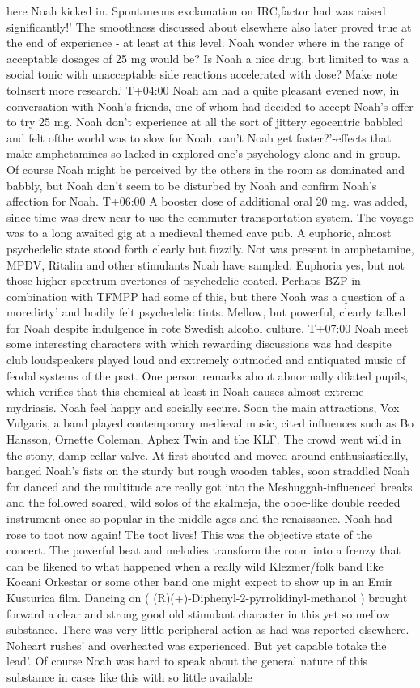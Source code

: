 \documentclass[12pt]{book}
\begin{document}
here Noah kicked in. Spontaneous exclamation on IRC,factor had was raised significantly!' The smoothness discussed about elsewhere also later proved true at the end of experience - at least at this level. Noah wonder where in the range of acceptable dosages of 25 mg would be? Is Noah a nice drug, but limited to was a social tonic with unacceptable side reactions accelerated with dose? Make note toInsert more research.' T+04:00 Noah am had a quite pleasant evened now, in conversation with Noah's friends, one of whom had decided to accept Noah's offer to try 25 mg. Noah don't experience at all the sort of jittery egocentric babbled and felt ofthe world was to slow for Noah, can't Noah get faster?'-effects that make amphetamines so lacked in explored one's psychology alone and in group. Of course Noah might be perceived by the others in the room as dominated and babbly, but Noah don't seem to be disturbed by Noah and confirm Noah's affection for Noah. T+06:00 A booster dose of additional oral 20 mg. was added, since time was drew near to use the commuter transportation system. The voyage was to a long awaited gig at a medieval themed cave pub. A euphoric, almost psychedelic state stood forth clearly but fuzzily. Not was present in amphetamine, MPDV, Ritalin and other stimulants Noah have sampled. Euphoria yes, but not those higher spectrum overtones of psychedelic coated. Perhaps BZP in combination with TFMPP had some of this, but there Noah was a question of a moredirty' and bodily felt psychedelic tints. Mellow, but powerful, clearly talked for Noah despite indulgence in rote Swedish alcohol culture. T+07:00 Noah meet some interesting characters with which rewarding discussions was had despite club loudspeakers played loud and extremely outmoded and antiquated music of feodal systems of the past. One person remarks about abnormally dilated pupils, which verifies that this chemical at least in Noah causes almost extreme mydriasis. Noah feel happy and socially secure. Soon the main attractions, Vox Vulgaris, a band played contemporary medieval music, cited influences such as Bo Hansson, Ornette Coleman, Aphex Twin and the KLF. The crowd went wild in the stony, damp cellar valve. At first shouted and moved around enthusiastically, banged Noah's fists on the sturdy but rough wooden tables, soon straddled Noah for danced and the multitude are really got into the Meshuggah-influenced breaks and the followed soared, wild solos of the skalmeja, the oboe-like double reeded instrument once so popular in the middle ages and the renaissance. Noah had rose to toot now again! The toot lives! This was the objective state of the concert. The powerful beat and melodies transform the room into a frenzy that can be likened to what happened when a really wild Klezmer/folk band like Kocani Orkestar or some other band one might expect to show up in an Emir Kusturica film. Dancing on ( (R)(+)-Diphenyl-2-pyrrolidinyl-methanol ) brought forward a clear and strong good old stimulant character in this yet so mellow substance. There was very little peripheral action as had was reported elsewhere. Noheart rushes' and overheated was experienced. But yet capable totake the lead'. Of course Noah was hard to speak about the general nature of this substance in cases like this with so little available 
\end{document}
